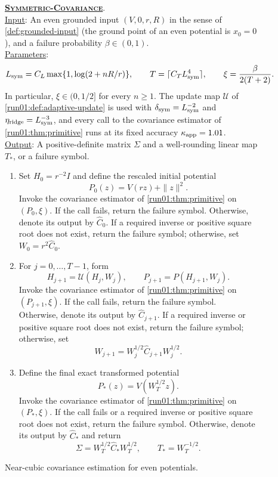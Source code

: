 \documentclass[11pt]{article}
\numberwithin{equation}{section}
\newenvironment{fminipage}%
  {\begin{Sbox}\begin{minipage}}%
  {\end{minipage}\end{Sbox}\fbox{\TheSbox}}
\newenvironment{algbox}[0]{\vskip 0.2in
\noindent
\begin{fminipage}{6.3in}
}{
\end{fminipage}
\vskip 0.2in
}
\theoremstyle{definition}
\newcommand{\algname}[1]{\textnormal{\textsc{#1}}}
\begin{document}
\begin{figure}[H]
    \centering
\begin{algbox}
\textbf{\uline{\algname{Symmetric-Covariance}}}.
\\ \uline{Input}: An even grounded input $(V,0,r,R)$ in the sense of
\cref{def:grounded-input} (the ground point of an even potential is
$x_0=0$), and a failure probability
$\beta\in(0,1)$.
\\ \uline{Parameters}:
\[
L_{\rm sym}=C_L\max\{1,\log(2+nR/r)\},
\qquad
T=\lceil C_TL_{\rm sym}^4\rceil,
\qquad
\xi=\frac{\beta}{2(T+2)}.
\]
In particular, $\xi\in(0,1/2]$ for every
$n\geq1$.
The update map $\mathcal U$ of \cref{run01:def:adaptive-update} is used with
$\delta_{\rm sym}=L_{\rm sym}^{-2}$ and
$\eta_{\rm ridge}=L_{\rm sym}^{-3}$, and every call to the covariance
estimator of \cref{run01:thm:primitive} runs at its fixed accuracy
$\kappa_{\rm app}=1.01$.
\\ \uline{Output}: A positive-definite matrix $\Sigma$ and a well-rounding
linear map $T_*$, or a failure symbol.
\begin{enumerate}
\item Set $H_0=r^{-2}I$ and define the rescaled initial potential
 \[
  P_0(z)=V(rz)+\|z\|^2.
 \]
Invoke the covariance estimator of \cref{run01:thm:primitive} on $(P_0,\xi)$.
If the call fails, return the failure symbol.
Otherwise, denote its output by $\widehat C_0$.
If a required inverse or positive square root does not exist, return the failure
symbol; otherwise, set $W_0=r^2\widehat C_0$.
\item For $j=0,\ldots,T-1$, form
 \[
H_{j+1}=\mathcal U(H_j,W_j),
\qquad
P_{j+1}=P(H_{j+1},W_j).
 \]
Invoke the covariance estimator of \cref{run01:thm:primitive} on
$(P_{j+1},\xi)$.
If the call fails, return the failure symbol.
Otherwise, denote its output by $\widehat C_{j+1}$.
If a required inverse or positive square root does not exist, return the failure
symbol; otherwise, set
 \[
  W_{j+1}=W_j^{1/2}\widehat C_{j+1}W_j^{1/2}.
 \]
\item Define the final exact transformed potential
 \[
  P_*(z)=V(W_T^{1/2}z).
 \]
Invoke the covariance estimator of \cref{run01:thm:primitive} on $(P_*,\xi)$.
If the call fails or a required inverse or positive square root does not exist,
return the failure symbol.
Otherwise, denote its output by $\widehat C_*$ and return
 \[
\Sigma=W_T^{1/2}\widehat C_*W_T^{1/2},
\qquad
T_*=W_T^{-1/2}.
 \]
\end{enumerate}
\end{algbox}
    \caption{Near-cubic covariance estimation for even potentials.}
    \label{fig:symmetric-covariance}
\end{figure}
\end{document}
